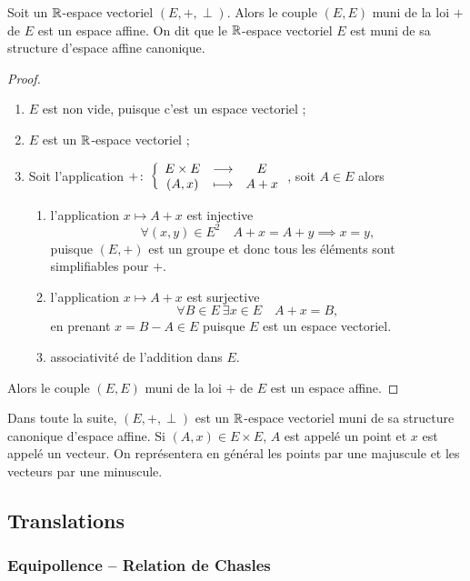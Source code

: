 \begin{prop}
  Soit un \(\mathbb{R}\)-espace vectoriel \((E,+,\perp)\). Alors le couple \((E,E)\) muni de la loi \(+\) de \(E\) est un espace affine. On dit que le \(\mathbb{R}\)-espace vectoriel \(E\) est muni de sa structure d'espace affine canonique.
\end{prop}
\begin{proof}
  \begin{enumerate}
  \item \(E\) est non vide, puisque c'est un espace vectoriel ;
  \item \(E\) est un \(\mathbb{R}\)-espace vectoriel ;
  \item Soit l'application \(+\colon \left\{\begin{array}{ccc} E\times E & \longrightarrow &E\\ (A,x) & \longmapsto & A+x \end{array} \right.\), soit \(A \in E\) alors
    \begin{enumerate}
    \item l'application \(x \longmapsto A+x\) est injective
      \begin{equation}
        \forall (x,y) \in E^2 \quad A+x=A+y \implies x=y,
      \end{equation}
      puisque \((E,+)\) est un groupe et donc tous les éléments sont simplifiables pour \(+\).
    \item l'application \(x \longmapsto A+x\) est surjective
      \begin{equation}
        \forall B \in E \ \exists x \in E \quad A+x=B,
      \end{equation}
      en prenant \(x=B-A \in E\) puisque \(E\) est un espace vectoriel.
    \item associativité de l'addition dans \(E\).
    \end{enumerate}
  \end{enumerate}
  Alors le couple \((E,E)\) muni de la loi \(+\) de \(E\) est un espace affine.
\end{proof}

Dans toute la suite, \((E,+,\perp)\) est un \(\mathbb{R}\)-espace vectoriel muni de sa structure canonique d'espace affine. Si \((A,x) \in E\times E\), \(A\) est appelé un point et \(x\) est appelé un vecteur. On représentera en général les points par une majuscule et les vecteurs par une minuscule.

\subsection{Translations}

\subsubsection{Equipollence -- Relation de Chasles}

